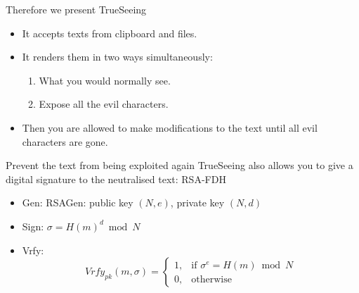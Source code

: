 \documentclass{beamer}
\begin{document}
\begin{frame}{Therefore we present TrueSeeing}
	\begin{itemize}
	\item It accepts texts from clipboard and files.
	\item It renders them in two ways simultaneously:
		\begin{enumerate}
		\item What you would normally see.
		\item Expose all the evil characters.
		\end{enumerate}
	\item Then you are allowed to make modifications to the text until all evil characters are gone.
	\end{itemize}
\end{frame}

\begin{frame}{Prevent the text from being exploited again}
	TrueSeeing also allows you to give a digital signature to the neutralised text: RSA-FDH
        \begin{itemize}
	      \item Gen: RSAGen: public key $(N, e)$, private key $(N, d)$
	      \item Sign: $\sigma = H(m)^d \bmod N$
            \item Vrfy: \[ Vrfy_{pk}(m, \sigma) = 
                \begin{cases} 
                    1, & \text{if } \sigma^e = H(m) \bmod N \\
                    0, & \text{otherwise}
                \end{cases}
                \]
	\end{itemize}
\end{frame}
\end{document}
